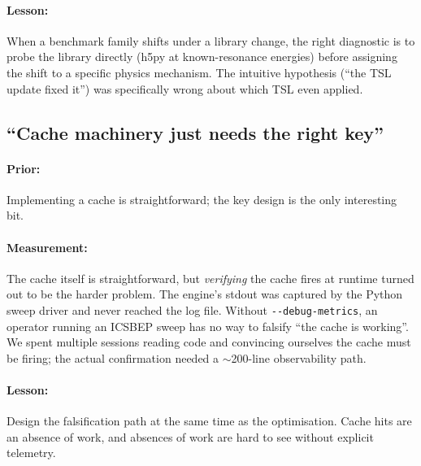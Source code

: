 \paragraph{Lesson:} When a benchmark family shifts under a
library change, the right diagnostic is to probe the library
directly (h5py at known-resonance energies) before assigning
the shift to a specific physics mechanism. The intuitive
hypothesis (``the TSL update fixed it'') was specifically wrong
about which TSL even applied.

\subsection{``Cache machinery just needs the right key''}

\paragraph{Prior:} Implementing a cache is straightforward; the
key design is the only interesting bit.

\paragraph{Measurement:} The cache itself is straightforward, but
\emph{verifying} the cache fires at runtime turned out to be
the harder problem. The engine's stdout was captured by the
Python sweep driver and never reached the log file. Without
\texttt{-{}-debug-metrics}, an operator running an ICSBEP sweep
has no way to falsify ``the cache is working''. We spent multiple
sessions reading code and convincing ourselves the cache must be
firing; the actual confirmation needed a $\sim$200-line
observability path.

\paragraph{Lesson:} Design the falsification path at the same
time as the optimisation. Cache hits are an absence of work, and
absences of work are hard to see without explicit telemetry.
